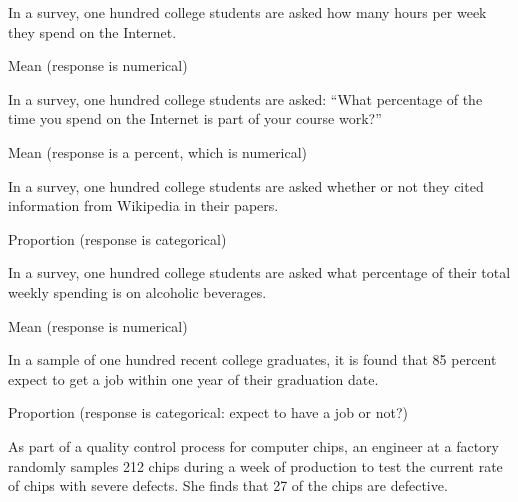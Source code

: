 \documentclass[12pt,answers]{exam}
\begin{document}
\begin{questions}
  \begin{parts}
  \item
    In a survey, one hundred college students are asked how many hours
    per week they spend on the Internet.
\begin{solution}
Mean (response is numerical)
\end{solution}
\vfill
  \item
    In a survey, one hundred college students are asked: ``What
    percentage of the time you spend on the Internet is part of your
    course work?''
\begin{solution}
Mean (response is a percent, which is numerical)
\end{solution}
\vfill
  \item
    In a survey, one hundred college students are asked whether or not
    they cited information from Wikipedia in their papers.
\begin{solution}
Proportion (response is categorical)
\end{solution}
\vfill
  \item
    In a survey, one hundred college students are asked what percentage
    of their total weekly spending is on alcoholic beverages.
\begin{solution}
Mean (response is numerical)
\end{solution}
\vfill
  \item
    In a sample of one hundred recent college graduates, it is found
    that 85 percent expect to get a job within one year of their
    graduation date.
\begin{solution}
Proportion (response is categorical: expect to have a job or not?)
\end{solution}
\vfill
  \end{parts}
\item
  As part of a quality control process for computer chips, an engineer
  at a factory randomly samples 212 chips during a week of production to
  test the current rate of chips with severe defects. She finds that 27
  of the chips are defective.


\end{questions}
\end{document}
